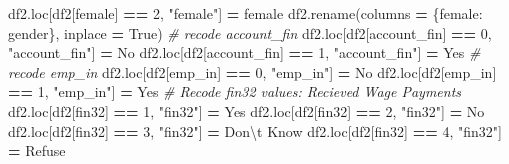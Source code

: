\documentclass[water,article,submit,moreauthors,pdftex]{mdpi}
\newenvironment{Shaded}{\begin{snugshade}}{\end{snugshade}}
\newcommand{\CharTok}[1]{\textcolor[rgb]{0.31,0.60,0.02}{#1}}
\newcommand{\CommentTok}[1]{\textcolor[rgb]{0.56,0.35,0.01}{\textit{#1}}}
\newcommand{\DecValTok}[1]{\textcolor[rgb]{0.00,0.00,0.81}{#1}}
\newcommand{\NormalTok}[1]{#1}
\newcommand{\OperatorTok}[1]{\textcolor[rgb]{0.81,0.36,0.00}{\textbf{#1}}}
\newcommand{\StringTok}[1]{\textcolor[rgb]{0.31,0.60,0.02}{#1}}
\newcommand{\VariableTok}[1]{\textcolor[rgb]{0.00,0.00,0.00}{#1}}
\begin{document}
\begin{Shaded}
\begin{Highlighting}[]
\NormalTok{df2.loc[df2[}\StringTok{\textquotesingle{}female\textquotesingle{}}\NormalTok{] }\OperatorTok{==} \DecValTok{2}\NormalTok{, }\StringTok{"female"}\NormalTok{] }\OperatorTok{=} \StringTok{\textquotesingle{}female\textquotesingle{}}
\NormalTok{df2.rename(columns }\OperatorTok{=}\NormalTok{ \{}\StringTok{\textquotesingle{}female\textquotesingle{}}\NormalTok{: }\StringTok{\textquotesingle{}gender\textquotesingle{}}\NormalTok{\}, inplace }\OperatorTok{=} \VariableTok{True}\NormalTok{)}
\CommentTok{\# recode account\_fin}
\NormalTok{df2.loc[df2[}\StringTok{\textquotesingle{}account\_fin\textquotesingle{}}\NormalTok{] }\OperatorTok{==} \DecValTok{0}\NormalTok{, }\StringTok{"account\_fin"}\NormalTok{] }\OperatorTok{=} \StringTok{\textquotesingle{}No\textquotesingle{}}
\NormalTok{df2.loc[df2[}\StringTok{\textquotesingle{}account\_fin\textquotesingle{}}\NormalTok{] }\OperatorTok{==} \DecValTok{1}\NormalTok{, }\StringTok{"account\_fin"}\NormalTok{] }\OperatorTok{=} \StringTok{\textquotesingle{}Yes\textquotesingle{}}
\CommentTok{\# recode emp\_in}
\NormalTok{df2.loc[df2[}\StringTok{\textquotesingle{}emp\_in\textquotesingle{}}\NormalTok{] }\OperatorTok{==} \DecValTok{0}\NormalTok{, }\StringTok{"emp\_in"}\NormalTok{] }\OperatorTok{=} \StringTok{\textquotesingle{}No\textquotesingle{}}
\NormalTok{df2.loc[df2[}\StringTok{\textquotesingle{}emp\_in\textquotesingle{}}\NormalTok{] }\OperatorTok{==} \DecValTok{1}\NormalTok{, }\StringTok{"emp\_in"}\NormalTok{] }\OperatorTok{=} \StringTok{\textquotesingle{}Yes\textquotesingle{}}
\CommentTok{\# Recode fin32 values: Recieved Wage Payments}
\NormalTok{df2.loc[df2[}\StringTok{\textquotesingle{}fin32\textquotesingle{}}\NormalTok{] }\OperatorTok{==} \DecValTok{1}\NormalTok{, }\StringTok{"fin32"}\NormalTok{] }\OperatorTok{=} \StringTok{\textquotesingle{}Yes\textquotesingle{}}
\NormalTok{df2.loc[df2[}\StringTok{\textquotesingle{}fin32\textquotesingle{}}\NormalTok{] }\OperatorTok{==} \DecValTok{2}\NormalTok{, }\StringTok{"fin32"}\NormalTok{] }\OperatorTok{=} \StringTok{\textquotesingle{}No\textquotesingle{}}
\NormalTok{df2.loc[df2[}\StringTok{\textquotesingle{}fin32\textquotesingle{}}\NormalTok{] }\OperatorTok{==} \DecValTok{3}\NormalTok{, }\StringTok{"fin32"}\NormalTok{] }\OperatorTok{=} \StringTok{\textquotesingle{}Don}\CharTok{\textbackslash{}\textquotesingle{}}\StringTok{t Know\textquotesingle{}}
\NormalTok{df2.loc[df2[}\StringTok{\textquotesingle{}fin32\textquotesingle{}}\NormalTok{] }\OperatorTok{==} \DecValTok{4}\NormalTok{, }\StringTok{"fin32"}\NormalTok{] }\OperatorTok{=} \StringTok{\textquotesingle{}Refuse\textquotesingle{}}

\end{Highlighting}
\end{Shaded}
\end{document}
